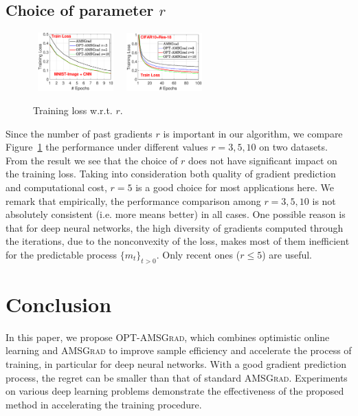 \documentclass[11pt]{article}
\theoremstyle{k}
\begin{document}
\subsection{Choice of parameter $r$}\label{sec:choicer}
\begin{figure}\vspace{-0.3in}
\begin{center}
\mbox{
\includegraphics[width=1.15in]{new_figure/new_mnist_img_figure/mnist_img_train_loss_r3510_2.eps}\vspace{-0.5in}
}
\mbox{
\includegraphics[width=1.15in]{new_figure/cifar10_train_loss_r3510.eps}
}
\end{center}\vspace{-0.1in}
\caption{Training loss w.r.t. $r$.}\label{fig:compare}
\end{figure}
\vspace{-0.1in}
Since the number of past gradients $r$ is important in our algorithm, we compare Figure~\ref{fig:compare} the performance under different values $r=3,5,10$ on two datasets. 
From the result we see that the choice of $r$ does not have significant impact on the training loss.
Taking into consideration both quality of gradient prediction and computational cost, $r=5$ is a good choice for most applications here. 
We remark that empirically, the performance comparison among $r=3,5,10$ is not absolutely consistent (i.e. more means better) in all cases. 
One possible reason is that for deep neural networks, the high diversity of gradients computed through the iterations, due to the nonconvexity of the loss, makes most of them inefficient for the predictable process $\{m_t\}_{t>0}$. Only recent ones ($r \leq 5$) are useful.\vspace{-0.1in}
\section{Conclusion}
In this paper, we propose \textsc{OPT-AMSGrad}, which combines optimistic online learning and \textsc{AMSGrad} to improve sample efficiency and
accelerate the process of training, in particular for deep neural networks. 
With a good gradient prediction process, the regret can be smaller than that of standard \textsc{AMSGrad}. Experiments on various deep learning problems demonstrate the effectiveness of the proposed method in accelerating the training procedure. 
\end{document}
